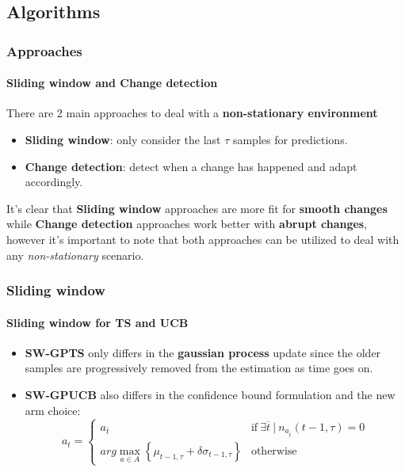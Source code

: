 
\subsection{Algorithms}


\begin{frame}
\frametitle{Approaches}
\framesubtitle{Sliding window and Change detection}

There are 2 main approaches to deal with a \textbf{non-stationary environment}
\begin{itemize}[label={$\circ$}]
    \item \textbf{Sliding window}: only consider the last $\tau$ samples for predictions.
    \item \textbf{Change detection}: detect when a change has happened and adapt accordingly.
\end{itemize}

It's clear that \textbf{Sliding window} approaches are more fit for \textbf{smooth changes} while \textbf{Change detection} approaches work better with \textbf{abrupt changes}, however it's important to note that both approaches can be utilized to deal with any \textit{non-stationary} scenario.

\end{frame}


\begin{frame}
\frametitle{Sliding window}
\framesubtitle{Sliding window for TS and UCB}

\begin{itemize}[leftmargin=*, label={$\circ$}]
    \item \textbf{SW-GPTS} only differs in the \textbf{gaussian process} update since the older samples are progressively removed from the estimation as time goes on.
    \item \textbf{SW-GPUCB} also differs in the confidence bound formulation and the new arm choice:
        \begin{displaymath}
            a_t =
            \begin{cases}
                a_{\overline{t}} & \text{if} ~ \exists \overline{t} ~ | ~ n_{a_{\overline{t}}}(t-1, \tau) = 0 \\
                arg\max_{a \in A} \left\{ \mu_{t-1, \tau} + \delta \sigma_{t-1, \tau} \right\} & \text{otherwise}
            \end{cases}
        \end{displaymath}
\end{itemize}

\end{frame}

